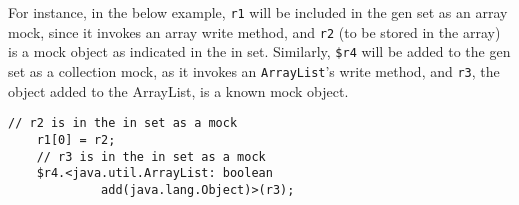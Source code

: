 For instance, in the below example, \texttt{r1} will be included in the gen set as an array mock, since it invokes an array write method, and \texttt{r2} (to be stored in the array) is a mock object as indicated in the in set. Similarly, \texttt{\$r4} will be added to the gen set as a collection mock, as it invokes an \texttt{ArrayList}'s write method, and \texttt{r3}, the object added to the ArrayList, is a known mock object.
\begin{lstlisting}[basicstyle=\ttfamily\small,numbers=none]
    // r2 is in the in set as a mock
    r1[0] = r2;
    // r3 is in the in set as a mock
    $r4.<java.util.ArrayList: boolean
             add(java.lang.Object)>(r3);
\end{lstlisting}







